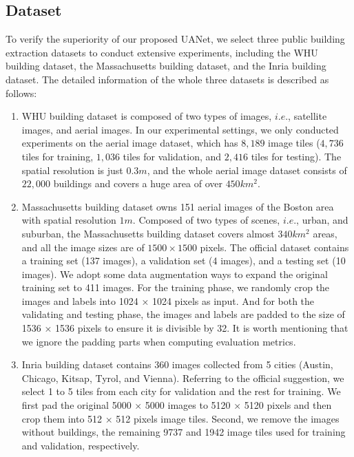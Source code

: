 \documentclass[lettersize,journal]{IEEEtran}
\begin{document}
\subsection{Dataset}
To verify the superiority of our proposed UANet, we select three public building extraction datasets to conduct extensive experiments, including the WHU building dataset, the Massachusetts building dataset, and the Inria building dataset. The detailed information of the whole three datasets is described as follows:
\begin{enumerate}
\item  WHU building dataset \cite{whu_dataset} is composed of two types of images, $i.e.$, satellite images, and aerial images. In our experimental settings, we only conducted experiments on the aerial image dataset, which has $8,189$ image tiles ($4,736$ tiles for training, $1,036$ tiles for validation, and $2,416$ tiles for testing). The spatial resolution is just $0.3m$, and the whole aerial image dataset consists of $22,000$ buildings and covers a huge area of over $450 km^2$.
\item Massachusetts building dataset \cite{Massachusetts_building} owns 151 aerial images of the Boston area with spatial resolution $1m$. Composed of two types of scenes, $i.e.$, urban, and suburban, the Massachusetts building dataset covers almost $340 km^2$ areas, and all the image sizes are of $1500 \times 1500$ pixels. The official dataset contains a training set (137 images), a validation set (4 images), and a testing set (10 images). We adopt some data augmentation ways to expand the original training set to 411 images. For the training phase, we randomly crop the images and labels into 1024 × 1024 pixels as input. And for both the validating and testing phase, the images and labels are padded to the size of
1536 × 1536 pixels to ensure it is divisible by 32. It is worth mentioning that we ignore the padding parts when computing evaluation metrics.
\item Inria building dataset \cite{inria_dataset} contains 360 images collected from 5 cities (Austin, Chicago, Kitsap, Tyrol, and Vienna). Referring to the official suggestion, we select 1 to 5 tiles from each city for
validation and the rest for training. We first pad the original 5000 × 5000 images to 5120 × 5120 pixels and then crop them into 512 × 512 pixels image tiles. Second, we remove the images without buildings, the remaining 9737 and 1942 image tiles used for training and validation, respectively.

\end{enumerate}
\end{document}
